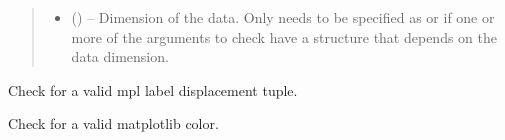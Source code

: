 \documentclass[letterpaper,10pt,english]{sphinxmanual}
\begin{document}
\begin{fulllineitems}
\begin{quote}
\begin{description}
\begin{itemize}
\begin{itemize}
\end{itemize}


\item {} 
\sphinxAtStartPar
{} (\sphinxstyleliteralemphasis{\sphinxupquote{, }}\sphinxstyleliteralemphasis{\sphinxupquote{, }}) – Dimension of the data. Only needs to be specified as  or 
if one or more of the arguments to check have a structure that
depends on the data dimension.

\end{itemize}

\end{description}\end{quote}

\begin{fulllineitems}
\label{\detokenize{references/misc:nmrespy._misc.ArgumentChecker.check_displacement}}
\sphinxAtStartPar
Check for a valid mpl label displacement tuple.

\end{fulllineitems}


\begin{fulllineitems}
\label{\detokenize{references/misc:nmrespy._misc.ArgumentChecker.check_mpl_color}}
\sphinxAtStartPar
Check for a valid matplotlib color.

\end{fulllineitems}



\end{fulllineitems}
\end{document}
